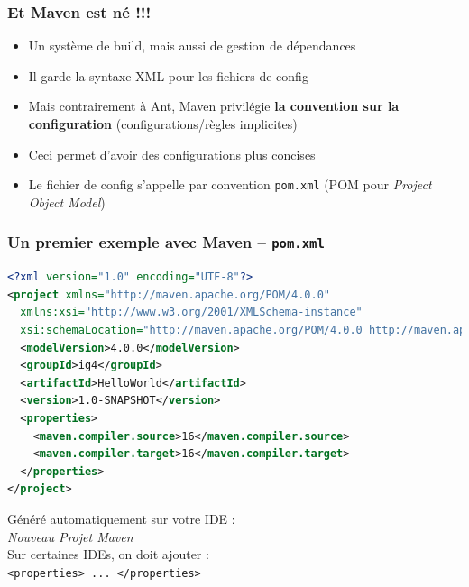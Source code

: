 \documentclass{beamer}
\begin{document}
\begin{frame}[fragile]
  \frametitle{Et Maven est né !!!}
\begin{itemize}
\item Un système de build, mais aussi de gestion de dépendances
\item Il garde la syntaxe XML pour les fichiers de config
\item Mais contrairement à Ant, Maven privilégie \textbf{la convention
    sur la configuration} (configurations/règles implicites)
\item Ceci permet d'avoir des configurations plus concises
\item Le fichier de config s'appelle par convention \texttt{pom.xml}
  (POM pour \textit{Project Object Model})
\end{itemize}
\end{frame}

\begin{frame}[fragile]
  \frametitle{Un premier exemple avec Maven -- \texttt{pom.xml} }
\begin{lstlisting}[language=XML,basicstyle=\tiny]  
<?xml version="1.0" encoding="UTF-8"?>
<project xmlns="http://maven.apache.org/POM/4.0.0"
  xmlns:xsi="http://www.w3.org/2001/XMLSchema-instance"
  xsi:schemaLocation="http://maven.apache.org/POM/4.0.0 http://maven.apache.org/xsd/maven-4.0.0.xsd">
  <modelVersion>4.0.0</modelVersion>
  <groupId>ig4</groupId>
  <artifactId>HelloWorld</artifactId>
  <version>1.0-SNAPSHOT</version>
  <properties>
    <maven.compiler.source>16</maven.compiler.source>
    <maven.compiler.target>16</maven.compiler.target>
  </properties>
</project>
\end{lstlisting}
Généré automatiquement sur votre IDE :\\
\textit{Nouveau Projet Maven}\\
Sur certaines IDEs, on doit ajouter :\\
\texttt{<properties> ... </properties>}
\vspace{4.5cm}
\end{frame}
\end{document}
